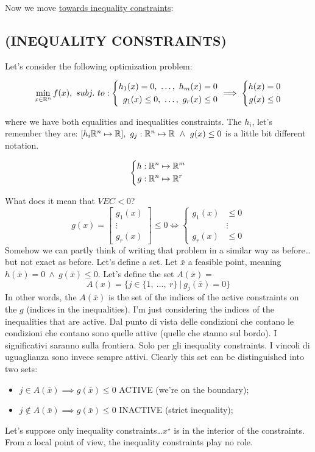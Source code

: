 Now we move \underline{towards inequality constraints}:

\subsection{(INEQUALITY CONSTRAINTS)}

Let's consider the following optimization problem:

\[
	\min_{x\in\mathbb{R}^n}{f(x)},\ subj.\ to: 
	\left\{
	\begin{aligned}
	h_1(x) = 0,\ \dots,\ h_m(x) = 0\\
	g_1(x) \leq 0,\ \dots,\ g_r(x) \leq0 
	\end{aligned}
	\right. \implies \left\{
	\begin{aligned}
	h(x) &= 0\\
	g(x) &\leq 0
	\end{aligned}
	\right.
\]

where we have both equalities and inequalities constraints. The $h_i$, let's remember they are: $[h_i\R^n\mapsto\R],\ g_j:\R^n\mapsto\R\ \land\ g(x)\leq 0$ is a little bit different notation.

\[
	\left\{
	\begin{aligned}
	h&:\mathbb{R}^n\mapsto\mathbb{R}^m\\
	g&:\mathbb{R}^n\mapsto\mathbb{R}^r
	\end{aligned}
	\right.
\]

What does it mean that $VEC < 0$?
\[
	g(x) = \begin{bmatrix}g_1(x)\\ \vdots\\g_r(x)\end{bmatrix} \leq 0 \iff
	\left\{
	\begin{aligned}
	g_1(x) &\leq 0\\
		   &\vdots\\
	g_r(x) &\leq 0
	\end{aligned}
	\right.
\]
Somehow we can partly think of writing that problem in a similar way as before\dots but not exact as before.
Let's define a set. Let $\bar{x}$ a feasible point, meaning $h(\bar{x})=0\ \land\ g(\bar{x}) \leq 0$. Let's define the set $A(\bar{x}) =$
\[
	A(x) = \{j\in\{1,\ \dots,\ r\}\ |\ g_j(\bar{x})=0\}
\]
In other words, the $A(\bar{x})$ is the set of the indices of the active constraints on the $g$ (indices in the inequalities).
I'm just considering the indices of the inequalities that are active. Dal punto di vista delle condizioni che contano le condizioni che contano sono quelle attive (quelle che stanno sul bordo). I significativi saranno sulla frontiera. Solo per gli inequality constraints. I vincoli di uguaglianza sono invece sempre attivi. Clearly this set can be distinguished into two sets:
\begin{itemize}
\item $j\in A(\bar{x}) \implies g(\bar{x}) \leq 0$ ACTIVE (we're on the boundary);
\item $j\notin A(\bar{x}) \implies g(\bar{x}) \leq 0$ INACTIVE (strict inequality);
\end{itemize}
Let's suppose only inequality constraints\dots $x^\star$ is in the interior of the constraints. From a local point of view, the inequality constraints play no role.

